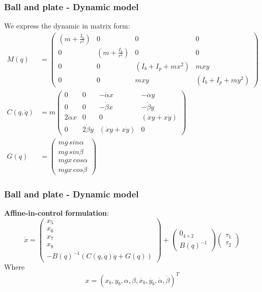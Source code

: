%
\begin{frame}
\frametitle{Ball and plate - Dynamic model}
%
We express the dynamic in matrix form:
%
\begin{equation*}
\begin{aligned}
M(q) &=%
\begin{pmatrix}
	\left(m + \frac{I_b}{r^2}\right) &0 &0 &0\\
	0 &\left(m + \frac{I_b}{r^2}\right) &0 &0\\
	0 &0 &\left(I_b + I_p + mx^2\right) &mxy\\
	0 &0 &mxy &\left(I_b + I_p + my^2\right)
\end{pmatrix}\\
C(q,\dot{q}) &=m%
\begin{pmatrix}
	0 &0 &-\dot{\alpha} x &-\dot{\alpha} y\\
	0 &0 &-\dot{\beta} x &-\dot{\beta} y\\
	2\dot{\alpha}x &0 &0 &\left(\dot{x}y+x\dot{y}\right)\\
	0 &2\dot{\beta}y &\left(\dot{x}y+x\dot{y}\right) &0
\end{pmatrix}\\
G(q) &=%
\begin{pmatrix}
	mg\,sin\alpha\\
	mg\,sin\beta\\
	mgx\,cos\alpha\\
	mgx\,cos\beta
\end{pmatrix}
\end{aligned}
\end{equation*}
\end{frame}
%
\begin{frame}
\frametitle{Ball and plate - Dynamic model}
%
\textbf{Affine-in-control formulation}:
\begin{equation}
	\dot{x} =%
	\begin{pmatrix}
	x_5\\ x_6\\ x_7\\ x_8\\ -B(q)^{-1}\left(C(q,\dot{q})\dot{q}+G(q)\right)
	\end{pmatrix}
	+
	\begin{pmatrix}
		0_{4\times2}\\
		B(q)^{-1}
	\end{pmatrix}
	\begin{pmatrix}
		\tau_1\\
	 	\tau_2
	\end{pmatrix}
\end{equation}
Where
\[x = (x_b, y_b, \alpha, \beta, \dot{x_b}, \dot{y_b}, \dot{\alpha}, \dot{\beta})^T\]
\end{frame}
